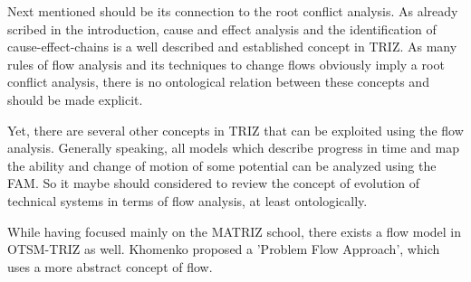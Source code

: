 \documentclass[a4paper,11pt]{article}
\begin{document}
\begin{itemize}
        Next mentioned should be its connection to the root conflict analysis. As already scribed in the introduction, cause and effect analysis and the
        identification of cause-effect-chains is a well described and established concept in TRIZ. As many rules of flow analysis and its techniques to
        change flows obviously imply a root conflict analysis, there is no ontological relation between these concepts and should be made explicit. 
        
        Yet, there are several other concepts in TRIZ that can be exploited using the flow analysis. Generally speaking, all models which describe 
        progress in time and map the ability and change of motion of some potential can be analyzed using the FAM. So it maybe should considered to
        review the concept of evolution of technical systems in terms of flow analysis, at least ontologically.
        
        While having focused mainly on the MATRIZ school, there exists a flow model in OTSM-TRIZ as well. Khomenko proposed a 'Problem Flow Approach',
        which uses a more abstract concept of flow. 

        


\end{itemize}
\end{document}

